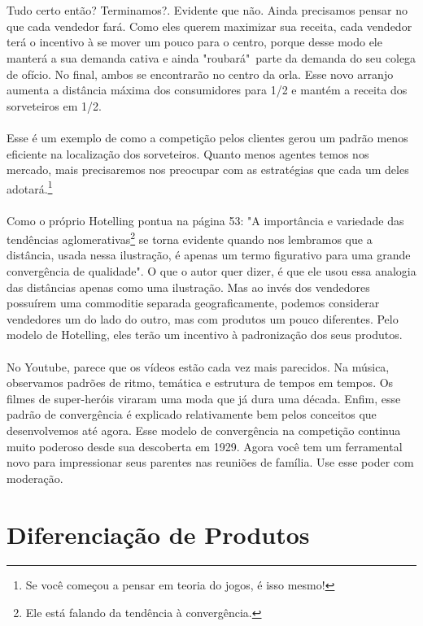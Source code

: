 \documentclass[a4paper,11pt,oneside]{book}
\theoremstyle{definition}
\theoremstyle{break}
\begin{document}
\\~\\
Tudo certo então? Terminamos?. Evidente que não. Ainda precisamos pensar no que cada vendedor fará. Como eles querem maximizar sua receita, cada vendedor terá o incentivo à se mover um pouco para o centro, porque desse modo ele manterá a sua demanda cativa e ainda "roubará"\ parte da demanda do seu colega de ofício. No final, ambos se encontrarão no centro da orla. Esse novo arranjo aumenta a distância máxima dos consumidores para 1/2 e mantém a receita dos sorveteiros em 1/2.
\\~\\
Esse é um exemplo de como a competição pelos clientes gerou um padrão menos eficiente na localização dos sorveteiros. Quanto menos agentes temos nos mercado, mais precisaremos nos preocupar com as estratégias que cada um deles adotará.\footnote{Se você começou a pensar em teoria do jogos, é isso mesmo!}
\\~\\
Como o próprio Hotelling pontua na página 53: "A importância e variedade das tendências aglomerativas\footnote{Ele está falando da tendência à convergência.} se torna evidente quando nos lembramos que a distância, usada nessa ilustração, é apenas um termo figurativo para uma grande convergência de qualidade". O que o autor quer dizer, é que ele usou essa analogia das distâncias apenas como uma ilustração. Mas ao invés dos vendedores possuírem uma commoditie separada geograficamente, podemos considerar vendedores um do lado do outro, mas com produtos um pouco diferentes. Pelo modelo de Hotelling, eles terão um incentivo à padronização dos seus produtos.
\\~\\
No Youtube, parece que os vídeos estão cada vez mais parecidos. Na música, observamos padrões de ritmo, temática e estrutura de tempos em tempos. Os filmes de super-heróis viraram uma moda que já dura uma década. Enfim, esse padrão de convergência é explicado relativamente bem pelos conceitos que desenvolvemos até agora. Esse modelo de convergência na competição continua muito poderoso desde sua descoberta em 1929. Agora você tem um ferramental novo para impressionar seus parentes nas reuniões de família. Use esse poder com moderação.

\section{Diferenciação de Produtos}
\end{document}
